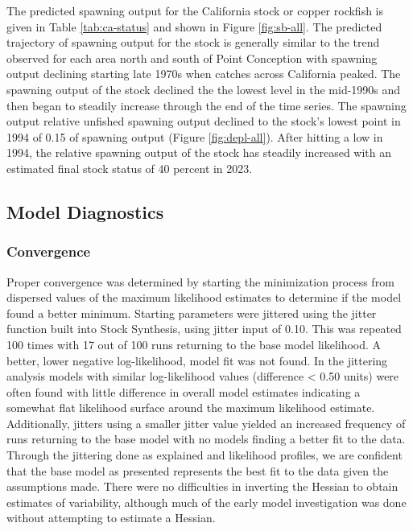 \documentclass[11pt,
  english,
  letterpaper,
]{article}
\begin{document}
The predicted spawning output for the California stock or copper rockfish is given in Table \ref{tab:ca-status} and shown in Figure \ref{fig:sb-all}. The predicted trajectory of spawning output for the stock is generally similar to the trend observed for each area north and south of Point Conception with spawning output declining starting late 1970s when catches across California peaked. The spawning output of the stock declined the the lowest level in the mid-1990s and then began to steadily increase through the end of the time series. The spawning output relative unfished spawning output declined to the stock's lowest point in 1994 of 0.15 of spawning output (Figure \ref{fig:depl-all}). After hitting a low in 1994, the relative spawning output of the stock has steadily increased with an estimated final stock status of 40 percent in 2023.

\hypertarget{model-diagnostics}{%
\subsection{Model Diagnostics}\label{model-diagnostics}}

\hypertarget{convergence}{%
\subsubsection{Convergence}\label{convergence}}

Proper convergence was determined by starting the minimization process from dispersed values of the maximum likelihood estimates to determine if the model found a better minimum. Starting parameters were jittered using the jitter function built into Stock Synthesis, using jitter input of 0.10. This was repeated 100 times with 17 out of 100 runs returning to the base model likelihood. A better, lower negative log-likelihood, model fit was not found. In the jittering analysis models with similar log-likelihood values (difference \textless{} 0.50 units) were often found with little difference in overall model estimates indicating a somewhat flat likelihood surface around the maximum likelihood estimate. Additionally, jitters using a smaller jitter value yielded an increased frequency of runs returning to the base model with no models finding a better fit to the data. Through the jittering done as explained and likelihood profiles, we are confident that the base model as presented represents the best fit to the data given the assumptions made. There were no difficulties in inverting the Hessian to obtain estimates of variability, although much of the early model investigation was done without attempting to estimate a Hessian.
\end{document}
